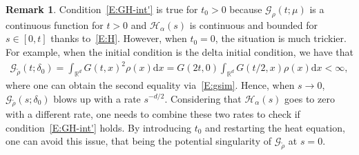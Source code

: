 \documentclass[a4paper,11pt]{article}%
\theoremstyle{plain}
\theoremstyle{definition}
\newtheorem{remark}[theorem]{Remark}
\numberwithin{equation}{section}
\newcommand{\R}{\mathbb{R}}
\newcommand{\ud}{\ensuremath{\mathrm{d}}}
\begin{document}
\begin{remark}
  Condition~\eqref{E:GH-int'} is true for $t_0>0$ because $\mathcal{G}_\rho(t;\mu)$ is a continuous
  function for $t>0$ and $\mathcal{H}_\alpha(s)$ is continuous and bounded for $s\in [0,t]$ thanks
  to~\eqref{E:H}. However, when $t_0 = 0$, the situation is much trickier. For example, when the
  initial condition is the delta initial condition, we have that
  \begin{align*}
    \mathcal{G}_{\tilde{\rho}}(t;\delta_0)
    = \int_{\R^d} G(t,x)^2 \rho(x) \ud x
    = G(2t,0) \int_{\R^d} G(t/2,x)\rho(x)\ud x
    < \infty,
  \end{align*}
  where one can obtain the second equality via~\eqref{E:gsim}. Hence, when $s\to 0$,
  $\mathcal{G}_{\tilde{\rho}}(s;\delta_0)$ blows up with a rate $s^{-d/2}$. Considering that
  $\mathcal{H}_\alpha(s)$ goes to zero with a different rate, one needs to combine these two rates
  to check if condition~\eqref{E:GH-int'} holds. By introducing $t_0$ and restarting the heat
  equation, one can avoid this issue, that being the potential singularity of
  $\mathcal{G}_{\tilde{\rho}}$ at $s = 0$.
\end{remark}
\end{document}

